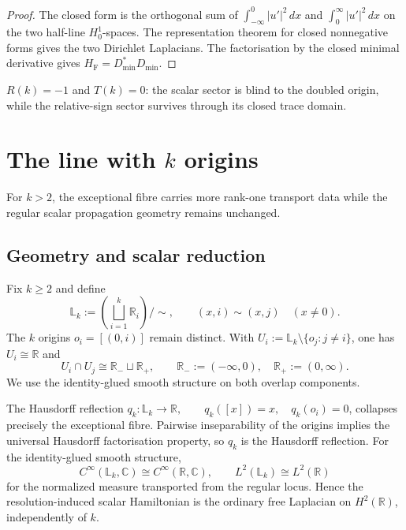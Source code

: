 \documentclass[11pt]{article}
\theoremstyle{plain}
\theoremstyle{definition}
\begin{document}
\begin{proof}
The closed form is the orthogonal sum of
\(\int_{-\infty}^0|u'|^2\,dx\) and \(\int_0^\infty|u'|^2\,dx\) on the two
half-line \(H^1_0\)-spaces. The representation theorem for closed
nonnegative forms gives the two Dirichlet Laplacians. The factorisation by
the closed minimal derivative gives \(H_{\mathrm F}=D_{\min}^*D_{\min}\).
\end{proof}

\(R(k)=-1\) and \(T(k)=0\): the scalar sector is blind to the doubled origin, while the relative-sign sector survives through its closed trace domain.

\section{\texorpdfstring{The line with \(k\) origins}{The line with k origins}}
\label{sec:Lk}

For \(k>2\), the exceptional fibre carries more rank-one transport data while the regular scalar propagation geometry remains unchanged.

\subsection{Geometry and scalar reduction}
\label{subsec:Lk-geometry}

Fix \(k\geq2\) and define
\[
  \mathbb L_k
  :=
  \left(
    \bigsqcup_{i=1}^{k}\mathbb R_i
  \right)\big/\!\sim,
  \qquad
  (x,i)\sim(x,j)
  \quad
  (x\neq0).
\]
The \(k\) origins \(o_i=[(0,i)]\) remain distinct. With
\(U_i := \mathbb L_k\setminus\{o_j:j\neq i\}\),
one has \(U_i\cong\mathbb R\) and
\[
  U_i\cap U_j
  \cong
  \mathbb R_-\sqcup\mathbb R_+,
  \qquad
  \mathbb R_-:=(-\infty,0),
  \quad
  \mathbb R_+:=(0,\infty).
\]
We use the identity-glued smooth structure on both overlap components.

The Hausdorff reflection
\(q_k:\mathbb L_k\longrightarrow\mathbb R, \qquad q_k([x])=x, \quad q_k(o_i)=0\),
collapses precisely the exceptional fibre. Pairwise inseparability of the
origins implies the universal Hausdorff factorisation property, so \(q_k\)
is the Hausdorff reflection. For the identity-glued smooth structure,
\[
  C^\infty(\mathbb L_k,\mathbb C)
  \cong
  C^\infty(\mathbb R,\mathbb C),
  \qquad
  L^2(\mathbb L_k)
  \cong
  L^2(\mathbb R)
\]
for the normalized measure transported from the regular locus. Hence the
resolution-induced scalar Hamiltonian is the ordinary free Laplacian on
\(H^2(\mathbb R)\), independently of \(k\).
\end{document}
